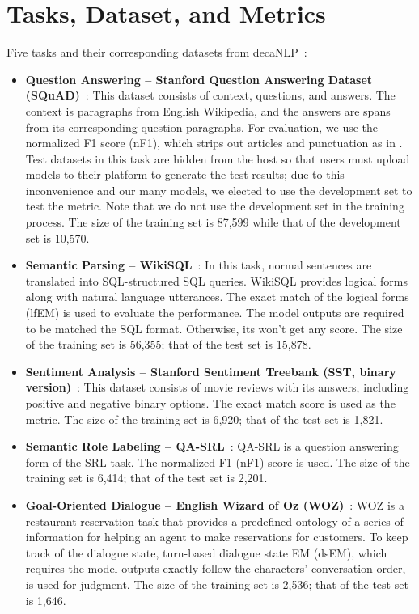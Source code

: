 \documentclass{article} %
\begin{document}
\clearpage
\appendix

\section{Tasks, Dataset, and Metrics} \label{appendix:dataset}
Five tasks and their corresponding datasets from decaNLP~\citep{McCann2018decaNLP}:
\begin{itemize}
\item \textbf{Question Answering -- Stanford Question Answering Dataset (SQuAD)}~\citep{rajpurkar2016squad}: This dataset consists of context, questions, and answers. The context is paragraphs from English Wikipedia, and the answers are spans from its corresponding question paragraphs. For evaluation, we use the normalized F1 score (nF1), which strips out articles and punctuation as in \citet{McCann2018decaNLP}. 
Test datasets in this task are hidden from the host so that users must upload models to their platform to generate the test results; due to this inconvenience and our many models, we elected to use the development set to test the metric. 
Note that we do not use the development set in the training process. The size of the training set is 87,599 while that of the development set is 10,570.

\item \textbf{Semantic Parsing -- WikiSQL}~\citep{zhong2017seq2sql}: In this task, normal sentences are translated into SQL-structured SQL queries. WikiSQL provides logical forms along with natural language utterances. The exact match of the logical forms (lfEM) is used to evaluate the performance. The model outputs are required to be matched the SQL format. Otherwise, its won't get any score. The size of the training set is 56,355; that of the test set is 15,878.

\item \textbf{Sentiment Analysis -- Stanford Sentiment Treebank (SST, binary version)}~\citep{radford2017learning}: This dataset consists of movie reviews with its answers, including positive and negative binary options. The exact match score is used as the metric. The size of the training set is 6,920; that of the test set is 1,821.

\item \textbf{Semantic Role Labeling -- QA-SRL}~\citep{he2017deep}: QA-SRL is a question answering form of the SRL task. The normalized F1 (nF1) score is used. The size of the training set is 6,414; that of the test set is 2,201.

\item \textbf{Goal-Oriented Dialogue -- English Wizard of Oz (WOZ)}~\citep{wen2016network}: WOZ is a restaurant reservation task that provides a predefined ontology of a series of information for helping an agent to make reservations for customers. To keep track of the dialogue state, turn-based dialogue state EM (dsEM), which requires the model outputs exactly follow the characters' conversation order, is used for judgment. The size of the training set is 2,536; that of the test set is 1,646.
\end{itemize}
\end{document}
